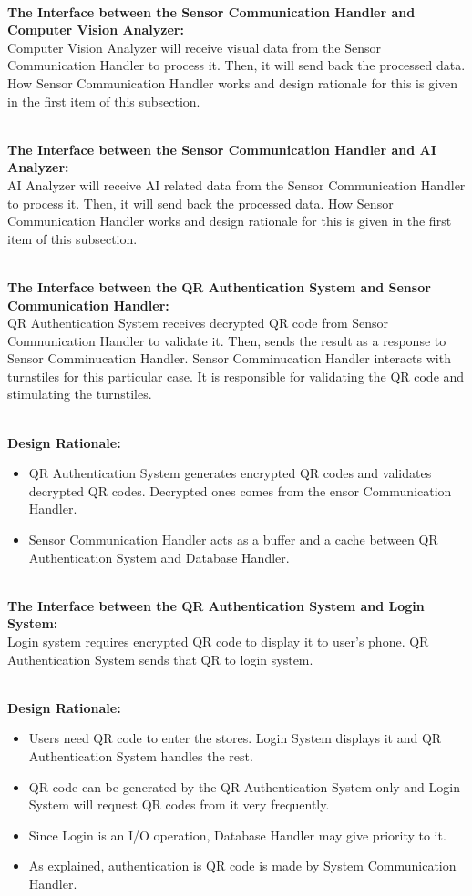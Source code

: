\documentclass[11pt]{article}
\begin{document}
    \textbf{\\The Interface between the Sensor Communication Handler and Computer Vision Analyzer:\\}
    Computer Vision Analyzer will receive visual data from the Sensor Communication Handler to process it. Then, it will send back the processed data. How Sensor 
    Communication Handler works and design rationale for this is given in the first item of this subsection. 
    

    \textbf{\\The Interface between the Sensor Communication Handler and AI Analyzer:\\}
    AI Analyzer will receive AI related data from the Sensor Communication Handler to process it. Then, it will send back the processed data. 
    How Sensor Communication Handler works and design rationale for this is given in the first item of this subsection. 
    
    \textbf{\\The Interface between the QR Authentication System and Sensor Communication Handler:\\}
    QR Authentication System receives decrypted QR code from Sensor Communication Handler to validate it. Then, sends the result as a response to Sensor Comminucation Handler.
    Sensor Comminucation Handler interacts with turnstiles for this particular case. It is responsible for validating the QR code and stimulating the turnstiles. 
   
    \textbf{\\Design Rationale:}
    \begin{itemize}
        \item QR Authentication System generates encrypted QR codes and validates decrypted QR codes. Decrypted ones comes from the ensor Communication Handler.
        \item Sensor Communication Handler acts as a buffer and a cache between QR Authentication System and Database Handler. 
    \end{itemize}

    \textbf{\\The Interface between the QR Authentication System and Login System:\\}
    Login system requires encrypted QR code to display it to user's phone. QR Authentication System sends that QR to login system.
    
    \textbf{\\Design Rationale:}
    \begin{itemize}
       \item Users need QR code to enter the stores. Login System displays it and QR Authentication System handles the rest.
       \item QR code can be generated by the QR Authentication System only and Login System will request QR codes from it very frequently.
       \item Since Login is an I/O operation, Database Handler may give priority to it.
       \item As explained, authentication is QR code is made by System Communication Handler.
    \end{itemize}
    
\end{document}
